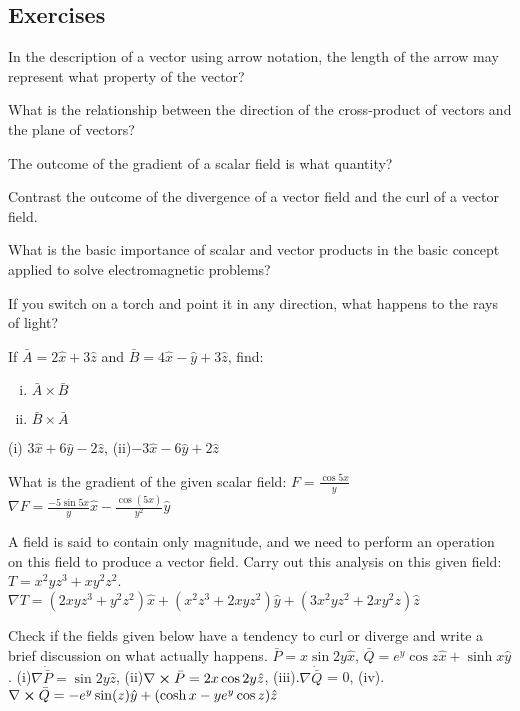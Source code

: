 \begin{mdframed}[ backgroundcolor=lightblue, linewidth=1pt, hidealllines=true]
\section{Exercises}
\begin{ExerciseList}
\Exercise[label={ex161}] 
In the description of a vector using arrow notation, the length of the arrow may represent what property of the vector?

\Exercise[label={ex162}] 
What is the relationship between the direction of the cross-product of vectors and the plane of vectors?

\Exercise[label={ex163}] 
The outcome of the gradient of a scalar field is what quantity?

\Exercise[label={ex164}] 
Contrast the outcome of the divergence of a vector field and the curl of a vector field. 

\Exercise[label={ex165}] 
What is the basic importance of scalar and vector products in the basic concept applied to solve electromagnetic problems?

\Exercise[label={ex166}] 
If you switch on a torch and point it in any direction, what happens to the rays of light?

\Exercise[label={ex167}] 
If $\bar{A} = 2\hat{x} + 3\hat{z}$ and $\bar{B} = 4\hat{x} - \hat{y} + 3\hat{z}$, find:
\begin{enumerate}[(i)]
\item $\bar{A} \times \bar{B}$
\item $\bar{B} \times \bar{A}$  
\end{enumerate}
\Answer[ref={ex167}]
(i) $3\hat{x}+6\hat{y}-2\hat{z}$, (ii)$-3\hat{x}-6\hat{y}+2\hat{z}$

\Exercise[label={ex168}] 
What is the gradient of the given scalar field: $F = \frac{\cos 5x}{y}$
\Answer[ref={ex168}]
$\nabla F = \frac{-5\sin 5x}{y}\hat{x} - \frac{\cos(5x)}{y^2}\hat{y}$

\Exercise[label={ex169}] 
A field is said to contain only magnitude, and we need to perform an operation on this field to produce a vector field. Carry out this analysis on this given field: $T = x^2yz^3 + xy^2z^2$.
\Answer[ref={ex169}]
$\nabla T= (2xyz^3+y^2z^2)\hat{x}+(x^2z^3+2xyz^2)\hat{y}+(3x^2yz^2+2xy^2z)\hat{z}$

\Exercise[label={ex1610}] 
Check if the fields given below have a tendency to curl or diverge and write a brief discussion on what actually happens.
$\bar{P} = x\sin 2y\hat{x}$, $\bar{Q} = e^{y}\cos z\hat{x} + \sinh x\hat{y}$.
\Answer[ref={ex1610}]
(i)$\nabla\dot{\bar{P}} = \sin 2y\hat{z}$, (ii)$\nabla\cross\bar{P} = 2x\cos 2y\hat{z}$, (iii).$\nabla\dot{\bar{Q}}$ = 0, (iv).$\nabla\cross\bar{Q} = -e^{y}\sin(z)\hat{y} + (\cosh x - ye^{y}\cos z)\hat{z}$
\end{ExerciseList}
\end{mdframed}
